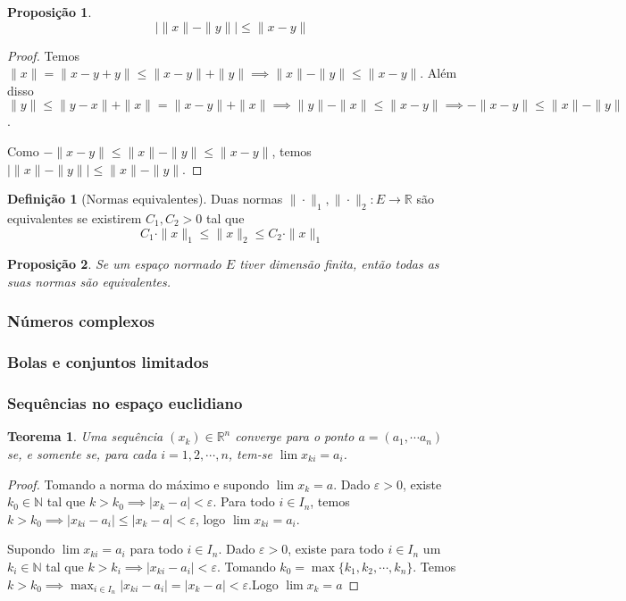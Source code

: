 \documentclass{article}
\newtheorem{prop}{Proposição}[section]
\theoremstyle{theorem}
\newtheorem{teo}{Teorema}
\theoremstyle{lemma}
\theoremstyle{definition}
\newtheorem{definicao}{Definição}[section]
\theoremstyle{remark}
\begin{document}
\begin{prop}
	$$| \| x \| - \| y \| |  \leq  \|  x - y \| $$
\end{prop}
\begin{proof}
	Temos $\| x\| = \| x-y +y\| \leq \|x-y\| +\|y\| \implies \| x\| - \|y\| \leq \| x-y\|$. Além disso $\|y\| \leq \|y-x\| + \|x\| = \|x-y\| +\|x\| \implies \|y\| -\|x\| \leq \| x-y\| \implies -\|x-y\| \leq \|x\| - \|y\|$.

	Como $-\|x-y\| \leq \|x\| - \|y\| \leq \|x-y\|$, temos $| \|x\| - \|y\| | \leq \|x\| -\|y\|$.

\end{proof}
\begin{definicao}[Normas equivalentes]
	Duas normas $\|\cdot \|_1, \| \cdot \|_2 : E \to \mathbb{R}$ são equivalentes se existirem $C_1,C_2 > 0$ tal que $$ C_1 \cdot \|x\|_1 \leq \|x\|_2 \leq C_2\cdot \| x\|_1 $$
\end{definicao}
\begin{prop}
	Se um espaço normado $E$ tiver dimensão finita, então todas as suas normas são equivalentes.
\end{prop}
   \subsubsection{Números complexos}
   \subsubsection{Bolas e conjuntos limitados}
   \subsubsection{Sequências no espaço euclidiano}
   \begin{teo}
	   Uma sequência $(x_k)\in \mathbb{R}^n$ converge para o ponto $a = (a_1,\cdots a_n)$ se, e somente se, para cada $i = 1,2,\cdots, n$, tem-se $\lim x_{ki} = a_i$.
   \end{teo}
   \begin{proof}
	   Tomando a norma do máximo e supondo $\lim x_k = a$. Dado $\varepsilon>0$, existe $k_0 \in \mathbb{N}$ tal que $k>k_0 \implies  |x_k - a| < \varepsilon$. Para todo $i\in I_n$, temos $k>k_0 \implies |x_{ki} - a_i|\leq |x_k - a| < \varepsilon$, logo $\lim x_{ki} = a_i$.

	   Supondo $\lim x_{ki}  = a_i$ para todo $i\in I_n$. Dado $\varepsilon >0$, existe para todo $i\in I_n$ um $k_i\in \mathbb{N}$ tal que $k > k_i \implies |x_{ki} - a_i | < \varepsilon$. Tomando $k_0 = \max\{ k_1,k_2,\cdots, k_n\}$. Temos $k>k_0 \implies \displaystyle\max_{i\in I_n} |x_{ki} -a_i| = |x_k -a| < \varepsilon$.Logo $\lim x_k = a$
   \end{proof}
\end{document}
